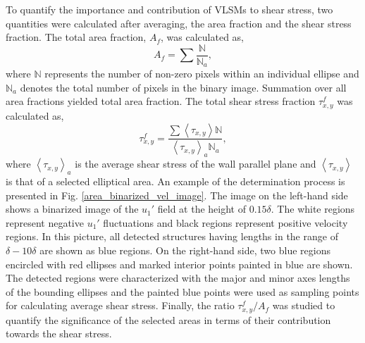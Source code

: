 To quantify the importance and contribution of VLSMs to shear stress, two quantities were calculated after averaging, the area fraction and the shear stress fraction. The total area fraction, $A_f$, was calculated as, 
\begin{equation*}
		A_f = \sum \frac{\mathbb{N}}{\mathbb{N}_a},
\label{eqn:area_frac_def}        
\end{equation*}
\noindent where $\mathbb{N}$ represents the number of non-zero pixels  within an individual ellipse and $\mathbb{N}_a$ denotes the total number of pixels in the binary image. Summation over all area fractions yielded total area fraction. The total shear stress fraction $\tau_{x,y}^f$ was  calculated as, 
\begin{equation*}
		\tau_{x,y}^f =\frac{\sum \left < \tau_{x,y} \right > \mathbb{N}}{\left < \tau_{x,y}\right >_a\mathbb{N}_a },
\label{eqn:stress_frac_def}             
\end{equation*}
\noindent where $\left < \tau_{x,y}\right >_a$  is the average shear stress of the wall parallel plane and $\left < \tau_{x,y} \right >$ is that of a selected elliptical area.  An example of the determination process is presented in Fig. \ref{area_binarized_vel_image}. The image on the left-hand side shows a binarized image of the $u_{1}'$ field at the height of $0.15\delta$.  The white regions represent negative $u_{1}'$ fluctuations and black regions represent positive velocity regions. In this picture, all detected structures having  lengths in the range  of $\delta-10\delta$ are shown as blue regions. On the right-hand side, two blue regions  encircled with red  ellipses and marked interior points painted in blue are shown.  The detected regions were characterized with the major and minor axes lengths of the bounding ellipses and the painted blue points were used as sampling points for calculating average shear stress. Finally, the ratio $\tau_{x,y}^f/A_f$ was studied to quantify the significance of the selected areas in terms of  their contribution towards the shear stress.  

